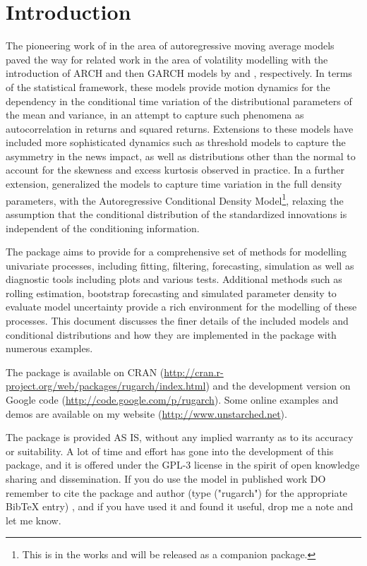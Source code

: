 \section{Introduction}
The pioneering work of \cite{Box1994} in the area of autoregressive moving
average models paved the way for related work in the area of volatility
modelling with the introduction of ARCH and then GARCH models by \cite{Engle1982}
and \cite{Bollerslev1986}, respectively. In terms of the statistical framework,
these models provide motion dynamics for the dependency in the conditional
time variation of the distributional parameters of the mean and variance, in an
attempt to capture such phenomena as autocorrelation in returns and squared
returns. Extensions to these models have included more sophisticated dynamics
such as threshold models to capture the asymmetry in the news impact, as well
as distributions other than the normal to account for the skewness and excess
kurtosis observed in practice. In a further extension, \cite{Hansen1994}
generalized the \verb@GARCH@ models to capture time variation in the full density
parameters, with the Autoregressive Conditional Density Model\footnote{This is in the
works and will be released as a companion package.}, relaxing the assumption that the
conditional distribution of the standardized innovations is independent of the
conditioning information.

The \verb@rugarch@ package aims to provide for a comprehensive set of methods
for modelling univariate \verb@GARCH@ processes, including fitting, filtering,
forecasting, simulation as well as diagnostic tools including plots and various
tests. Additional methods such as rolling estimation, bootstrap forecasting and
simulated parameter density to evaluate model uncertainty provide a rich
environment for the modelling of these processes. This document discusses the
finer details of the included models and conditional distributions and
how they are implemented in the package with numerous examples.

The \verb@rugarch@ package is available on CRAN
(\url{http://cran.r-project.org/web/packages/rugarch/index.html}) and the
development version on Google code (\url{http://code.google.com/p/rugarch}).
Some online examples and demos are available on my website
(\url{http://www.unstarched.net}).

The package is provided AS IS, without any implied warranty as to its accuracy
or suitability. A lot of time and effort has gone into the development of this
package, and it is offered under the GPL-3 license in the spirit of open
knowledge sharing and dissemination. If you do use the model in published work
DO remember to cite the package and author (type \verb@citation@("rugarch") for
the appropriate BibTeX entry) , and if you have used it and found it
useful, drop me a note and let me know.

